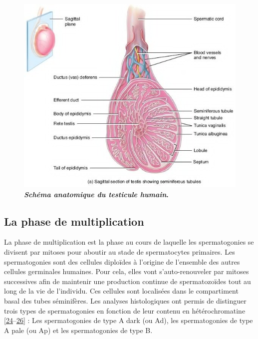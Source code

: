 \documentclass[12pt,a4paper,twoside]{ugathesis}
\theoremstyle{definition}
\theoremstyle{definition}
\theoremstyle{definition}
\theoremstyle{remark}
\begin{document}
\begin{figure}

{\centering \includegraphics[scale=0.65]{figure/coupe_testicule2} 

}

\caption[Schéma anatomique du testicule humain]{\textbf{\emph{Schéma anatomique du testicule humain}.}}\label{fig:testicule}
\end{figure}



\newpage

\subsection{La phase de
multiplication}\label{la-phase-de-multiplication}

La phase de multiplication est la phase au cours de laquelle les
spermatogonies se divisent par mitoses pour aboutir au stade de
spermatocytes primaires. Les spermatogonies sont des cellules diploïdes
à l'origine de l'ensemble des autres cellules germinales humaines. Pour
cela, elles vont s'auto-renouveler par mitoses successives afin de
maintenir une production continue de spermatozoïdes tout au long de la
vie de l'individu. Ces cellules sont localisées dans le compartiment
basal des tubes séminifères. Les analyses histologiques ont permis de
distinguer trois types de spermatogonies en fonction de leur contenu en
hétérochromatine
{[}\protect\hyperlink{ref-Clermont1963}{24}--\protect\hyperlink{ref-Goossens2013}{26}{]}
: Les spermatogonies de type A dark (ou Ad), les spermatogonies de type
A pale (ou Ap) et les spermatogonies de type B.
\end{document}
